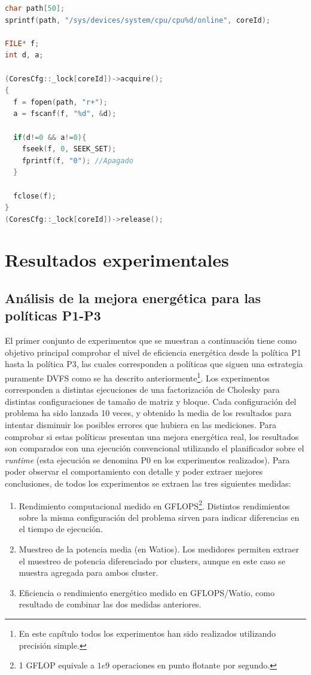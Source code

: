 \begin{lstlisting}[float,language=C++,caption={Fragmento de código para el apagado de cores de manera
    dinámica.},label={fig:lst:apagado-cores}]
char path[50];
sprintf(path, "/sys/devices/system/cpu/cpu%d/online", coreId);

FILE* f;
int d, a;

(CoresCfg::_lock[coreId])->acquire();
{
  f = fopen(path, "r+");
  a = fscanf(f, "%d", &d);
	
  if(d!=0 && a!=0){
    fseek(f, 0, SEEK_SET);
    fprintf(f, "0"); //Apagado
  }
	
  fclose(f);
}
(CoresCfg::_lock[coreId])->release();
\end{lstlisting}




\section{Resultados experimentales}

\subsection{Análisis de la mejora energética para las políticas P1-P3}
El primer conjunto de experimentos que se muestran a continuación tiene
como objetivo principal comprobar el nivel de eficiencia energética desde
la política P1 hasta la política P3, las cuales corresponden a políticas
que siguen una estrategia puramente DVFS como se ha descrito
anteriormente\footnote{En este capítulo todos los experimentos han sido
  realizados utilizando precisión simple.}. Los experimentos corresponden a
distintas ejecuciones de una factorización de Cholesky para distintas
configuraciones de tamaño de matriz y bloque. Cada configuración del
problema ha sido lanzada 10 veces, y obtenido la media de los resultados
para intentar disminuir los posibles errores que hubiera en las
mediciones. Para comprobar si estas políticas presentan una mejora
energética real, los resultados son comparados con una ejecución
convencional utilizando el planificador \botlev sobre el \emph{runtime}
\ompss (esta ejecución se denomina P0 en los experimentos realizados). Para
poder observar el comportamiento con detalle y poder extraer mejores
conclusiones, de todos los experimentos se extraen las tres siguientes
medidas:
\begin{enumerate}
\item Rendimiento computacional medido en GFLOPS\footnote{1 GFLOP equivale
    a $1e9$ operaciones en punto flotante por segundo.}. Distintos
  rendimientos sobre la misma configuración del problema sirven para
  indicar diferencias en el tiempo de ejecución.

\item Muestreo de la potencia media (en Watios). Los medidores permiten
  extraer el muestreo de potencia diferenciado por clusters, aunque en este
  caso se muestra agregada para ambos cluster.

\item Eficiencia o rendimiento energético medido en GFLOPS/Watio, como
  resultado de combinar las dos medidas anteriores.
\end{enumerate}

